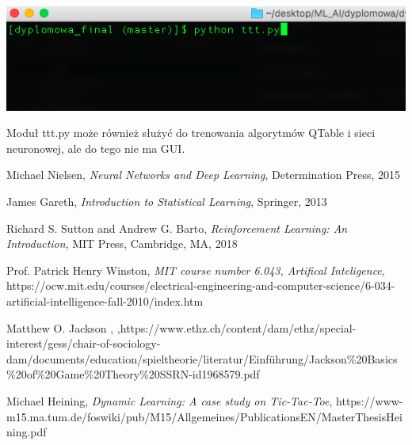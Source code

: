 \documentclass[licencjacka]{pracamgr}
\begin{document}
\begin{flushleft}
	\includegraphics [scale=0.5] {uruchamianie.png}
\end{flushleft} 


Moduł ttt.py może również służyć do trenowania algorytmów QTable i sieci neuronowej, ale do tego nie ma GUI.

\begin{thebibliography}{99}


	 Michael Nielsen, \textit{Neural Networks and Deep Learning}, Determination Press, 2015

	 James Gareth, \textit{Introduction to Statistical Learning}, Springer, 2013
	
	 Richard S. Sutton and Andrew G. Barto, \textit{Reinforcement Learning: An Introduction},  MIT Press, Cambridge, MA, 2018
	
	 Prof. Patrick Henry Winston, \textit{MIT course number 6.043, Artifical Inteligence}, https://ocw.mit.edu/courses/electrical-engineering-and-computer-science/6-034-artificial-intelligence-fall-2010/index.htm
	
	 Matthew O. Jackson , ,\linebreak https://www.ethz.ch/content/dam/ethz/special-interest/gess/chair-of-sociology-dam/documents/education/spieltheorie/literatur/Einführung/Jackson\linebreak\%20Basics\%20of\%20Game\%20Theory\%20SSRN-id1968579.pdf
	
	 Michael Heining, \textit{Dynamic Learning: A case study on Tic-Tac-Toe}, https://www-m15.ma.tum.de/foswiki/pub/M15/Allgemeines/PublicationsEN/MasterThesisHeining.pdf

\end{thebibliography}
\end{document}
